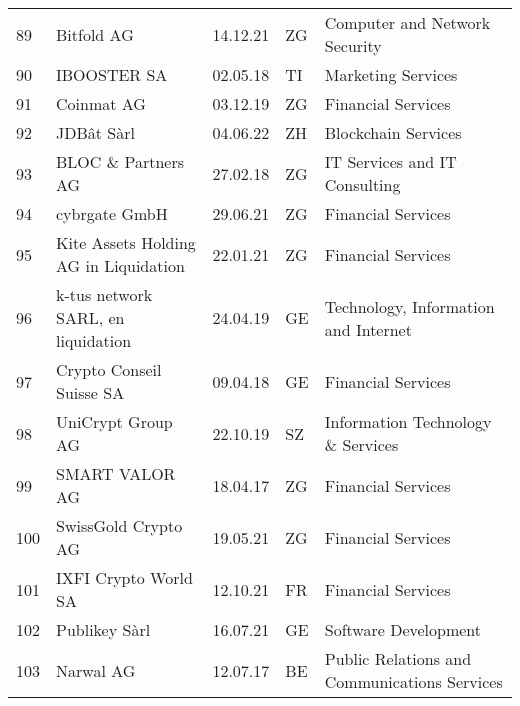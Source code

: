 \begin{tabular}{lllll}
89  &                                         Bitfold AG &      14.12.21 &     ZG &                  Computer and Network Security \\
90  &                                        IBOOSTER SA &      02.05.18 &     TI &                             Marketing Services \\
91  &                                         Coinmat AG &      03.12.19 &     ZG &                             Financial Services \\
92  &                                         JDBât Sàrl &      04.06.22 &     ZH &                            Blockchain Services \\
93  &                                 BLOC \& Partners AG &      27.02.18 &     ZG &                  IT Services and IT Consulting \\
94  &                                      cybrgate GmbH &      29.06.21 &     ZG &                             Financial Services \\
95  &              Kite Assets Holding AG in Liquidation &      22.01.21 &     ZG &                             Financial Services \\
96  &                 k-tus network SARL, en liquidation &      24.04.19 &     GE &           Technology, Information and Internet \\
97  &                           Crypto Conseil Suisse SA &      09.04.18 &     GE &                             Financial Services \\
98  &                                  UniCrypt Group AG &      22.10.19 &     SZ &              Information Technology \& Services \\
99  &                                     SMART VALOR AG &      18.04.17 &     ZG &                             Financial Services \\
100 &                                SwissGold Crypto AG &      19.05.21 &     ZG &                             Financial Services \\
101 &                               IXFI Crypto World SA &      12.10.21 &     FR &                             Financial Services \\
102 &                                      Publikey Sàrl &      16.07.21 &     GE &                           Software Development \\
103 &                                          Narwal AG &      12.07.17 &     BE &   Public Relations and Communications Services \\

\end{tabular}
